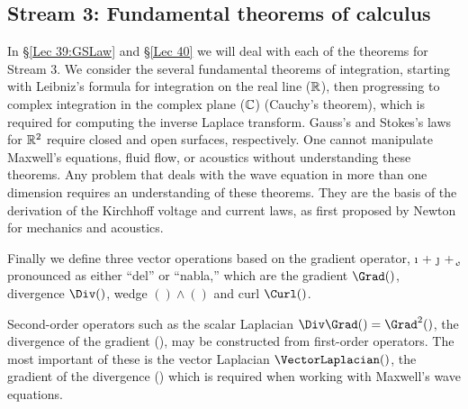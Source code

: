 \documentclass{ximera}
\begin{document}
\subsection{Stream 3: Fundamental theorems of calculus \label{FT:SVC}}

In \S \ref{Lec 39:GSLaw} and \S\ref{Lec 40} we will deal with each of the theorems for Stream 3. We consider the several fundamental theorems of integration, starting with Leibniz's
formula for integration on the real line ($\mathbb{R}$), then progressing to complex integration in the
complex plane ($\mathbb{C}$) (Cauchy's theorem), which is required for computing the inverse Laplace
transform. Gauss's and Stokes's laws for $\mathbb{R}^2$ require closed and open surfaces, respectively.
One cannot manipulate Maxwell's equations, fluid flow, or acoustics without understanding these theorems.
Any problem that deals with the wave equation in more than one dimension requires an understanding of
these theorems. They are the basis of the derivation of the Kirchhoff voltage and current laws, as first proposed by Newton for mechanics
and acoustics.

Finally we define three vector operations based on the gradient operator,
\be
\Grad \equiv
 \i {} + \j {} + \k {},
\label{eq:Grad1}
\ee
 pronounced as either ``del'' or ``nabla,'' which are the
  gradient $\Grad()$,
  divergence $\Div()$,
  wedge $()\!\wedge\!()$
  and
  curl $\Curl()$.

Second-order operators such as the 
 scalar Laplacian $\Div\Grad() = \Grad^2()$, the divergence of the gradient (\DoG), may be constructed
 from first-order operators. The most important of these is the vector Laplacian $\VectorLaplacian()$,
the gradient of the divergence (\gOd) which is required when working with Maxwell's
wave equations.%
\end{document}

